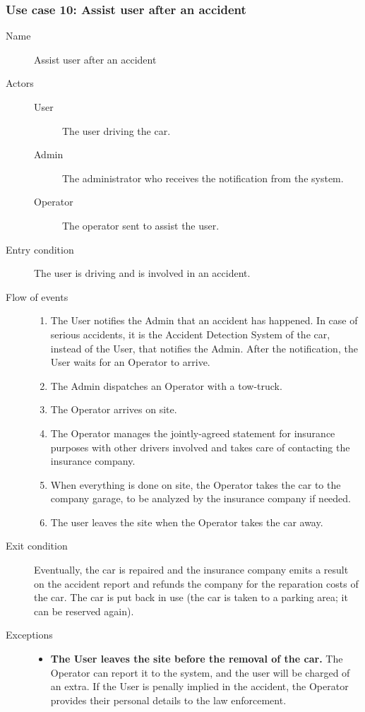 	\subsubsection{Use case 10: Assist user after an accident}
		\begin{description}
			\item[Name] Assist user after an accident
			\item[Actors] \hfill
			\begin{description}
				\item[User] The user driving the car.
				\item[Admin] The administrator who receives the notification from the system.
				\item[Operator] The operator sent to assist the user.
			\end{description}
			\item[Entry condition] The user is driving and is involved in an accident.
			\item[Flow of events] \hfill
			\begin{enumerate}
				\item The User notifies the Admin that an accident has happened. In case of serious accidents, it is the Accident Detection System of the car, instead of the User, that notifies the Admin. After the notification, the User waits for an Operator to arrive.
				\item The Admin dispatches an Operator with a tow-truck.
				\item The Operator arrives on site.
				\item The Operator manages the jointly-agreed statement for insurance purposes with other drivers involved and takes care of contacting the insurance company.
				\item When everything is done on site, the Operator takes the car to the company garage, to be analyzed by the insurance company if needed.
				\item The user leaves the site when the Operator takes the car away.
			\end{enumerate}
			\item[Exit condition] Eventually, the car is repaired and the insurance company emits a result on the accident report and refunds the company for the reparation costs of the car. The car is put back in use (the car is taken to a parking area; it can be reserved again).
			\item[Exceptions] \hfill
			\begin{itemize}
				\item \textbf{The User leaves the site before the removal of the car.} The Operator can report it to the system, and the user will be charged of an extra. If the User is penally implied in the accident, the Operator provides their personal details to the law enforcement.

\end{itemize}
\end{description}
